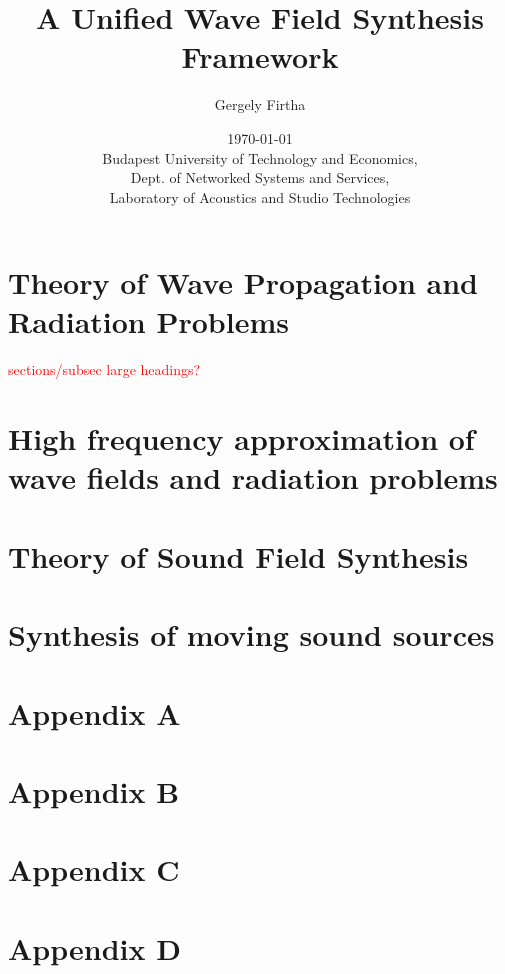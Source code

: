 \documentclass[12pt,a4paper]{report}
\title{A Unified Wave Field Synthesis Framework \\
		\large \fscom{with Special Focus on Moving Virtual Sources}}
\date{\today \\
Budapest University of Technology and Economics, \\ Dept. of Networked Systems and Services, \\ Laboratory of Acoustics and Studio Technologies}
\author{Gergely Firtha}
\newcommand{\fscom}[2][red]{\textcolor{#1}{#2}} %
\begin{document}

\maketitle
\tableofcontents


%
%
\chapter{Theory of Wave Propagation and Radiation Problems}
\label{sec:general_wave_theory}
\fscom{sections/subsec large headings?}

%
%
%
\chapter{High frequency approximation of wave fields and radiation problems}
\label{sec:high_freq_approx}

%
%
%
\chapter{Theory of Sound Field Synthesis}
\label{sec:sound_field_synthesis}

%
%
\chapter{Synthesis of moving sound sources}
\label{sec:moving_source_synthesis}


\begin{appendices}
\chapter{Appendix A}

\chapter{Appendix B}

\chapter{Appendix C}

\chapter{Appendix D}

\end{appendices}




\end{document}
